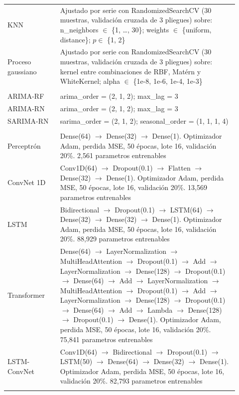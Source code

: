 \begin{longtable}{>{\raggedright\arraybackslash}p{0.21\linewidth}>{\raggedright\arraybackslash}p{0.71\linewidth}}
\hspace{.6em}KNN & Ajustado por serie con RandomizedSearchCV (30 muestras, validación cruzada de 3 pliegues) sobre: n\_neighbors $\in$ \{1, \dots, 30\}; weights $\in$ \{uniform, distance\}; $p \in$ \{1, 2\} \\
\hspace{.6em}Proceso gaussiano & Ajustado por serie con RandomizedSearchCV (30 muestras, validación cruzada de 3 pliegues) sobre: kernel entre combinaciones de RBF, Matérn y WhiteKernel; alpha $\in$ \{1e-8, 1e-6, 1e-4, 1e-3\} \\
\addlinespace
\multicolumn{2}{l}{\textit{Híbrido}} \\[1mm]
\hspace{.6em}ARIMA-RF & arima\_order = (2, 1, 2); max\_lag = 3 \\
\hspace{.6em}ARIMA-RN & arima\_order = (2, 1, 2); max\_lag = 3 \\
\hspace{.6em}SARIMA-RN & sarima\_order = (2, 1, 2); seasonal\_order = (1, 1, 1, 4) \\
\addlinespace
\multicolumn{2}{l}{\textit{Red neuronal}} \\[1mm]
\hspace{.6em}Perceptrón & Dense(64) $\to$ Dense(32) $\to$ Dense(1). Optimizador Adam, perdida MSE, 50 épocas, lote 16, validación 20\%. 2,561 parametros entrenables \\
\hspace{.6em}ConvNet 1D & Conv1D(64) $\to$ Dropout(0.1) $\to$ Flatten $\to$ Dense(32) $\to$ Dense(1). Optimizador Adam, perdida MSE, 50 épocas, lote 16, validación 20\%. 13,569 parametros entrenables \\
\hspace{.6em}LSTM & Bidirectional $\to$ Dropout(0.1) $\to$ LSTM(64) $\to$ Dense(32) $\to$ Dense(32) $\to$ Dense(1). Optimizador Adam, perdida MSE, 50 épocas, lote 16, validación 20\%. 88,929 parametros entrenables \\
\hspace{.6em}Transformer & Dense(64) $\to$ LayerNormalization $\to$ MultiHeadAttention $\to$ Dropout(0.1) $\to$ Add $\to$ LayerNormalization $\to$ Dense(128) $\to$ Dropout(0.1) $\to$ Dense(64) $\to$ Add $\to$ LayerNormalization $\to$ MultiHeadAttention $\to$ Dropout(0.1) $\to$ Add $\to$ LayerNormalization $\to$ Dense(128) $\to$ Dropout(0.1) $\to$ Dense(64) $\to$ Add $\to$ Lambda $\to$ Dense(128) $\to$ Dropout(0.1) $\to$ Dense(1). Optimizador Adam, perdida MSE, 50 épocas, lote 16, validación 20\%. 75,841 parametros entrenables \\
\hspace{.6em}LSTM-ConvNet & Conv1D(64) $\to$ Bidirectional $\to$ Dropout(0.1) $\to$ LSTM(50) $\to$ Dense(64) $\to$ Dense(32) $\to$ Dense(1). Optimizador Adam, perdida MSE, 50 épocas, lote 16, validación 20\%. 82,793 parametros entrenables \\
\addlinespace
\end{longtable}